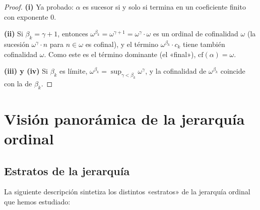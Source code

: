 \begin{proof}
\textbf{(i)} Ya probado: $\alpha$ es sucesor si y solo si termina en un coeficiente finito con exponente $0$.

\textbf{(ii)} Si $\beta_k = \gamma + 1$, entonces $\omega^{\beta_k} = \omega^{\gamma+1} = \omega^\gamma \cdot \omega$ es un ordinal de cofinalidad $\omega$ (la sucesión $\omega^\gamma \cdot n$ para $n \in \omega$ es cofinal), y el término $\omega^{\beta_k} \cdot c_k$ tiene también cofinalidad $\omega$. Como este es el término dominante (el «final»), $\mathrm{cf}(\alpha) = \omega$.

\textbf{(iii) y (iv)} Si $\beta_k$ es límite, $\omega^{\beta_k} = \sup_{\gamma < \beta_k} \omega^\gamma$, y la cofinalidad de $\omega^{\beta_k}$ coincide con la de $\beta_k$.
\end{proof}

\section{Visión panorámica de la jerarquía ordinal}

\subsection{Estratos de la jerarquía}

La siguiente descripción sintetiza los distintos «estratos» de la jerarquía ordinal que hemos estudiado:

